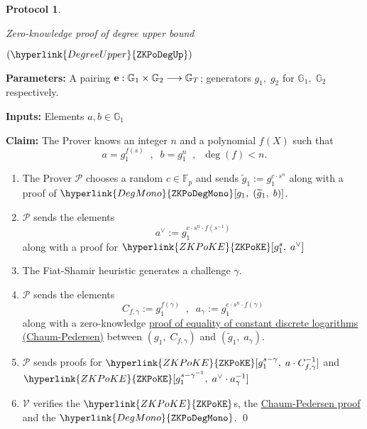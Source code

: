 \documentclass[11pt, lettersize, notitlepage, leqno, footskip=0.6cm]{article}
\newcommand{\bFp}{\mathbb{F}_p}
\newcommand{\lra}{\longrightarrow}
\newcommand{\wti}{\widetilde}
\newcommand{\mc}{\mathcal}
\newcommand{\mb}{\mathbb}
\newcommand{\mbf}{\mathbf}
\newcommand{\what}{\widehat}
\newcommand{\mP}{\mc{P}}
\newcommand{\V}{\mc{V}}
\newcommand{\vs}{\vspace{-0.15cm}}
\newcommand{\sta}{\stackrel{?}{=}}
\newcommand{\e}{\mbf{e}}
\newtheorem{Prot}[Thm]{Protocol}
\numberwithin{equation}{section}
\begin{document}
\begin{comment}\vs $$ \e(Q_{\gamma}\;,\;g_2^{s-\gamma})\sta \e(a\cdot C_{f,\gamma}^{-1}\;,\; g_2)\;\;,\;\; \e(\what{Q}_{\gamma}\;,\;g_2^{s-\gamma^{-1}})\sta \e(a^{\vee}\cdot a_{\gamma}^{-1}\;,\;g_2) \vs $$ \end{comment}




\bigskip




\begin{mdframed}
\begin{Prot} \hypertarget{DegreeUpper}{Zero-knowledge proof of degree upper bound} $(\hyperlink{DegreeUpper}{\tt{ZKPoDegUp}})$\end{Prot}  

\noindent \textbf{Parameters:} A pairing ${\bf{e}}:\mb{G}_1\times \mb{G}_2\lra \mb{G}_T$; generators $g_1,\;g_2$ for $\mb{G}_1,\; \mb{G}_2$ respectively.


\noindent \textbf{Inputs:} Elements $a, b\in \mb{G}_1$

\noindent \textbf{Claim:} The Prover knows an integer $n$ and a polynomial $f(X)$  such that \vs $$a = g_1^{f(s)}\;\;,\;\; b = g_1^n \;\;,\;\; \deg(f) < n  .$$ 

\begin{enumerate}[wide, labelwidth=!, labelindent=0pt, itemsep=-0.2ex]

\item The Prover $\mP$ chooses a random $c\in \bFp$ and sends $\wti{g}_1:= g_1^{c\cdot s^n}$   along with a proof of $\hyperlink{DegMono}{\tt{ZKPoDegMono}}[g_1,\;(\wti{g}_1,\;b)]$.

\item $\mP$ sends the elements \vs $$a^{\vee}:= g_1^{c\cdot s^n\cdot f(s^{-1})} $$ along with a proof for $\hyperlink{ZKPoKE}{\tt{ZKPoKE}}[g_1^s,\;a^{\vee}]$ 

\item The Fiat-Shamir heuristic generates a challenge $\gamma$.

\item $\mP$ sends the elements $$C_{f,\gamma}:= g_1^{f(\gamma)}\;\;,\;\; a_{\gamma}:= g_1^{c\cdot s^n\cdot f(\gamma)}   $$ along with a zero-knowledge \hyperlink{CP}{proof of equality of constant discrete logarithms (Chaum-Pedersen)} between $(g_1,\;C_{f,\gamma})$ and $(\wti{g}_1,\; a_{\gamma})$.


\item $\mP$ sends proofs for $\hyperlink{ZKPoKE}{\tt{ZKPoKE}}[g_1^{s-\gamma},\;a\cdot C_{f,\gamma}^{-1}]$ and $\hyperlink{ZKPoKE}{\tt{ZKPoKE}}[g_1^{s-\gamma^{-1}},\;a^{\vee}\cdot a_{\gamma}^{-1}]$

\item $\V$ verifies the $\hyperlink{ZKPoKE}{\tt{ZKPoKE}}$s, the \hyperlink{CP}{Chaum-Pedersen proof} and the $\hyperlink{DegMono}{\tt{ZKPoDegMono}}$. \qed \end{enumerate} \end{mdframed}
\end{document}

